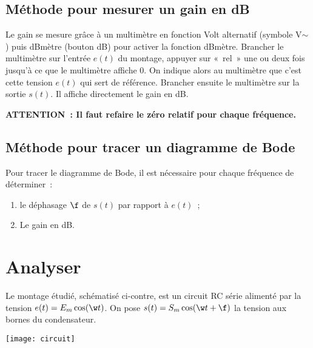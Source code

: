 \documentclass[a4paper, 11pt, final, garamond]{book}
\begin{document}
\subsection{Méthode pour mesurer un gain en dB}

Le gain se mesure grâce à un multimètre en fonction Volt alternatif (symbole
V$\sim$) puis dBmètre (bouton dB) pour activer la fonction dBmètre. Brancher le
multimètre sur l'entrée $e(t)$ du montage, appuyer sur «~rel~» une ou deux fois
jusqu'à ce que le multimètre affiche 0. On indique alors au multimètre que c'est
cette tension $e(t)$ qui sert de référence. Brancher ensuite le multimètre sur
la sortie $s(t)$. Il affiche directement le gain en dB.

\begin{brapp}{}
    \centering
    \textbf{ATTENTION~: Il faut refaire le zéro relatif pour chaque fréquence.}
\end{brapp}

\subsection{Méthode pour tracer un diagramme de Bode}

Pour tracer le diagramme de Bode, il est nécessaire pour chaque fréquence de
déterminer~:
\begin{enumerate}
    \item le déphasage $\f$ de $s(t)$ par rapport à $e(t)$~;
    \item Le gain en dB.
\end{enumerate}

\section{Analyser}

\begin{minipage}{0.60\linewidth}
    Le montage étudié, schématisé ci-contre, est un circuit RC série alimenté
    par la tension $e(t) = E_{m} \cos(\w t)$. On pose $s(t) = S_{m} \cos (\w t +
    \f)$ la tension aux bornes du condensateur.
\end{minipage}
\hfill
\begin{minipage}{0.35\linewidth}
    \begin{center}
        \texttt{[image: circuit]}
    \end{center}
\end{minipage}
\end{document}
